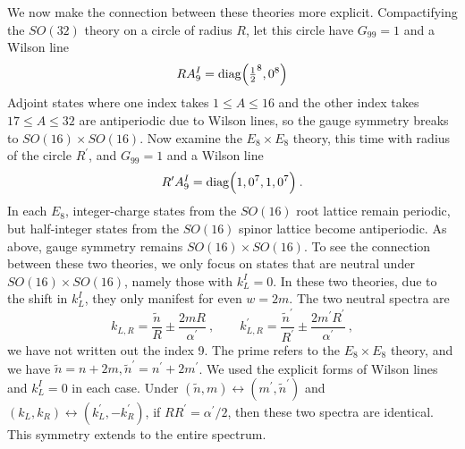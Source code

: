 We now make the connection between these theories more explicit. Compactifying the $SO(32)$ theory on a circle of radius $R$, let this circle have $G_{99}=1$ and a Wilson line
\begin{equation}
	RA_{9}^{I}=\operatorname{diag}\Bigl(\tfrac{1}{2}^{8},0^{8}\Bigr)
	\label{11.6.18}
\end{equation}
Adjoint states where one index takes $1\leq A\leq 16$ and the other index takes $17\leq A\leq 32$ are antiperiodic due to Wilson lines, so the gauge symmetry breaks to $SO(16)\times SO(16)$. Now examine the $E_{8}\times E_{8}$ theory, this time with radius of the circle $R^{\prime}$, and $G_{99}=1$ and a Wilson line
\begin{equation}
	R^{\prime}A_{9}^{I}=\operatorname{diag}\Bigl(1,0^{7},1,0^{7}\Bigr) \:.
	\label{11.6.19}
\end{equation}
In each $E_{8}$, integer-charge states from the $SO(16)$ root lattice remain periodic, but half-integer states from the $SO(16)$ spinor lattice become antiperiodic. As above, gauge symmetry remains $SO(16)\times SO(16)$. To see the connection between these two theories, we only focus on states that are neutral under $SO(16)\times SO(16)$, namely those with $k_{L}^{I}=0$. In these two theories, due to the shift in $k_{L}^{I}$, they only manifest for even $w=2m$. The two neutral spectra are
\begin{equation}
	k_{L,R}=\frac{\tilde{n}}{R} \pm \frac{2mR}{\alpha^{\prime}}\:,\qquad k_{L,R}^{\prime} =\frac{\tilde{n}^{\prime}}{R^{\prime}} \pm \frac{2m^{\prime}R^{\prime}}{\alpha^{\prime}}\:,
\end{equation}
we have not written out the index 9. The prime refers to the $E_{8}\times E_{8}$ theory, and we have $\tilde{n}=n+2m, \tilde{n}^{\prime}=n^{\prime}+2m^{\prime}$. We used the explicit forms of Wilson lines and $k_{L}^{I}=0$ in each case. Under $(\tilde{n},m)\leftrightarrow (m^{\prime},\tilde{n}^{\prime})$ and $(k_{L},k_{R})\leftrightarrow (k_{L}^{\prime},-k_{R}^{\prime})$, if $RR^{\prime}=\alpha^{\prime}/2$, then these two spectra are identical. This symmetry extends to the entire spectrum.
